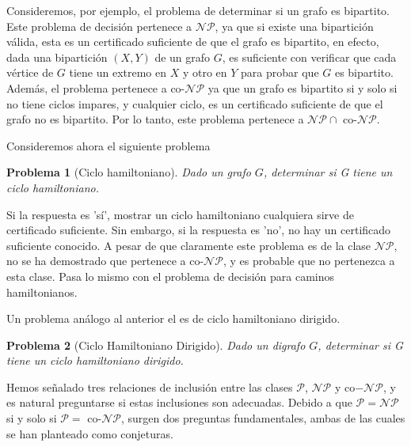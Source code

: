 \documentclass{article}
\newtheorem{problem}{Problema}
\begin{document}
Consideremos, por ejemplo, el problema de determinar
si un grafo es bipartito. Este problema de decisión pertenece
a $\mathcal{NP}$, ya que si existe una bipartición válida, esta es un
certificado suficiente de que el grafo es bipartito, en efecto,
dada una bipartición $(X,Y)$ de un grafo $G$, es
suficiente con verificar que cada vértice de $G$
tiene un extremo en $X$ y otro en $Y$ para probar que $G$ es bipartito.
Además, el problema pertenece a co-$\mathcal{NP}$ ya que un grafo es 
bipartito si y solo si no tiene ciclos impares, y cualquier ciclo, es un 
certificado suficiente de que el grafo no es bipartito. Por lo tanto, 
este problema pertenece a $\mathcal{NP} \cap$ co-$\mathcal{NP}$.

Consideremos ahora el siguiente problema
\begin{problem}[Ciclo hamiltoniano]
    Dado un grafo $G$, determinar si G tiene un ciclo hamiltoniano.
\end{problem}
Si la respuesta es 'sí', mostrar un ciclo hamiltoniano cualquiera sirve de certificado suficiente. Sin embargo, si la respuesta
es 'no', no hay un certificado suficiente conocido. A pesar 
de que claramente este problema es de la clase $\mathcal{NP}$,
no se ha demostrado
que pertenece a co-$\mathcal{NP}$, y es probable que no
pertenezca a esta clase. Pasa lo mismo con el problema de
decisión para caminos hamiltonianos.

Un problema análogo al anterior el es de ciclo hamiltoniano
dirigido.
\begin{problem}[Ciclo Hamiltoniano Dirigido]
    Dado un digrafo $G$, determinar si G tiene un
    ciclo hamiltoniano dirigido.
\end{problem}

Hemos señalado tres relaciones de inclusión entre las clases
$\mathcal{P}$, $\mathcal{N}\mathcal{P}$ y
co$-\mathcal{N}\mathcal{P}$, y es natural preguntarse
si estas inclusiones son adecuadas. Debido a que
$\mathcal{P} = \mathcal{N}\mathcal{P}$
si y solo si $\mathcal{P} = $ co-$\mathcal{N}\mathcal{P}$,
surgen dos preguntas fundamentales, ambas de las cuales se han 
planteado como conjeturas. 

\setlength{\fboxsep}{10pt}
\noindent{}
\end{document}
